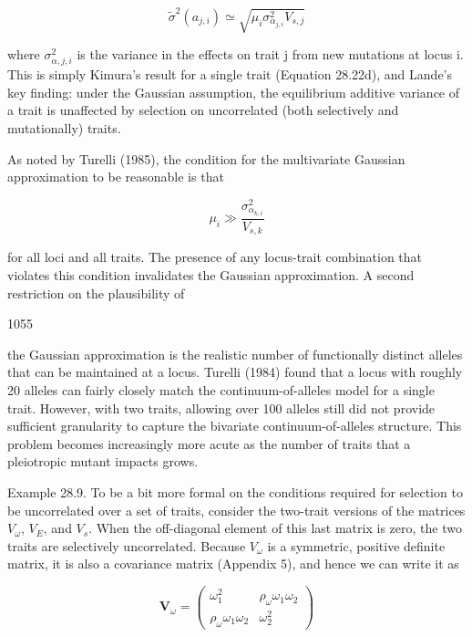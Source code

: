 \documentclass{article}
\begin{document}
\begin{equation}
\widetilde{\sigma}^{2}(a_{j,i})\simeq\sqrt{\mu_{i}\sigma_{\alpha_{j,i}}^{2}V_{s,j}}
\tag{28.38a}
\label{eq:28_38a}
\end{equation}

where  $ \sigma_{\alpha,j,i}^{2} $ is the variance in the effects on trait j from new mutations at locus i. This is simply Kimura's result for a single trait (Equation 28.22d), and Lande's key finding: under the Gaussian assumption, the equilibrium additive variance of a trait is unaffected by selection on uncorrelated (both selectively and mutationally) traits.

As noted by Turelli (1985), the condition for the multivariate Gaussian approximation to be reasonable is that

\begin{equation}
\mu_{i}\gg\frac{\sigma_{\alpha_{k,i}}^{2}}{V_{s,k}}
\tag{28.38b}
\label{eq:28_38b}
\end{equation}

for all loci and all traits. The presence of any locus-trait combination that violates this condition invalidates the Gaussian approximation. A second restriction on the plausibility of

1055

the Gaussian approximation is the realistic number of functionally distinct alleles that can be maintained at a locus. Turelli (1984) found that a locus with roughly 20 alleles can fairly closely match the continuum-of-alleles model for a single trait. However, with two traits, allowing over 100 alleles still did not provide sufficient granularity to capture the bivariate continuum-of-alleles structure. This problem becomes increasingly more acute as the number of traits that a pleiotropic mutant impacts grows.

Example 28.9. To be a bit more formal on the conditions required for selection to be uncorrelated over a set of traits, consider the two-trait versions of the matrices  $ V_\omega $,  $ V_E $, and  $ V_s $. When the off-diagonal element of this last matrix is zero, the two traits are selectively uncorrelated. Because  $ V_\omega $ is a symmetric, positive definite matrix, it is also a covariance matrix (Appendix 5), and hence we can write it as

\begin{equation}
\mathbf{V}_{\omega}=\begin{pmatrix}\omega_{1}^{2}&\rho_{\omega}\omega_{1}\omega_{2}\\ \rho_{\omega}\omega_{1}\omega_{2}&\omega_{2}^{2}\end{pmatrix}
\end{equation}
\end{document}
